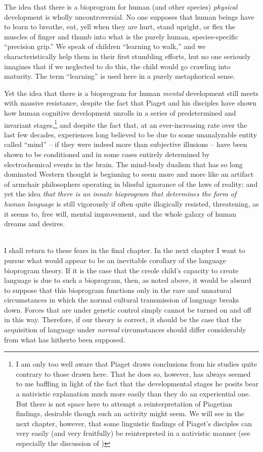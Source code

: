 The idea that there is a bioprogram for human (and other species) \textit{physical} development is wholly uncontroversial. No one supposes that human beings have to learn to breathe, eat, yell when they are hurt, stand upright, or flex the muscles of finger and thumb into what is the purely human, species-specific ``precision grip.'' We speak of children ``learning to walk,'' and we characteristically help them in their first stumbling efforts, hut no one seriously imagines that if we neglected to do this, the child would go crawling into maturity. The term ``learning'' is used here in a purely metaphorical sense.

Yet the idea that there is a bioprogram for human \textit{mental} development still meets with massive resistance, despite the fact that Piaget and his disciples have shown how human cognitive development unrolls in a series of predetermined and invariant stages,\footnote{I am only too well aware that Piaget draws conclusions from his studies quite contrary to those drawn here. That he does so, however, has always seemed to me baffling in light of the fact that the developmental stages he posits bear a nativistic explanation much more easily than they do an experiential one. But there is not space here to attempt a reinterpretation of Piagetian findings, desirable though such an activity might seem. We will see in the next chapter, however, that some linguistic findings of Piaget's disciples can very easily (and very fruitfully) be reinterpreted in a nativistic manner (see especially the discussion of \citealt{BrockartEtAl1973})} and despite
the fact that, at an ever-increasing rate over the last few decades, experiences long believed to be due to some unanalyzable entity called ``mind'' -- if they were indeed more than subjective illusions -- have been shown to be conditioned and in some cases entirely determined by electrochemical events in the brain. The mind-body dualism that has so long dominated Western thought is beginning to seem more and more like an artifact of armchair philosophers operating in blissful ignorance of the laws of reality; and yet the idea \textit{that there is an innate bioprogram that determines the form of human language} is still vigorously if often quite illogically resisted, threatening, as it seems to, free will, mental improvement, and the whole galaxy of human dreams and desires.\\\\

I shall return to these fears in the final chapter. In the next chapter I want to pursue what would appear to be an inevitable corollary of the language bioprogram theory. If it is the case that the creole child's capacity to create language is due to such a bioprogram, then, as noted above, it would be absurd to suppose that this bioprogram functions only in the rare and unnatural circumstances in which the normal cultural transmission of language breaks down. Forces that are under genetic control simply cannot be turned on and off in this way. Therefore, if our theory is correct, it should be the case that the acquisition of language under \textit{normal} circumstances should differ considerably from what has hitherto been supposed.

